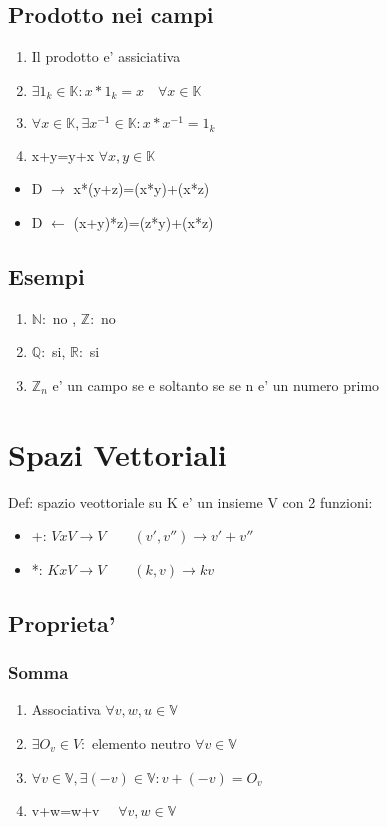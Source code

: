 \documentclass{article}
\begin{document}
\subsection{Prodotto nei campi}
\begin{enumerate}
	\item Il prodotto e' assiciativa
	\item $\exists 1_k \in \mathbb{K} : x*1_k=x \quad \forall x\in \mathbb{K}$
	\item $\forall x \in  \mathbb{K},\exists x^{-1} \in \mathbb{K}:x*x^{-1}=1_k$
	\item x+y=y+x $\forall x,y \in \mathbb{K}$
\end{enumerate}
\begin{itemize}
	\item D $\rightarrow$ x*(y+z)=(x*y)+(x*z)
	\item D $\leftarrow$ (x+y)*z)=(z*y)+(x*z)
\end{itemize}
\subsection*{Esempi}
\begin{enumerate}
	\item $\mathbb{N}:$ no , $\mathbb{Z}: $ no
	\item $\mathbb{Q}:$ si, $\mathbb{R}: $ si
	\item $\mathbb{Z}_n$ e' un campo se e soltanto se se n e' un numero primo
\end{enumerate}
\section{Spazi Vettoriali}
\begin{flushleft}
	Def: spazio veottoriale su K e' un insieme V con 2 funzioni:
\end{flushleft}
\begin{itemize}
	\item +: $VxV \to V \quad \quad (v',v'') \to v' + v''$
	\item *: $KxV \to V \quad \quad (k,v)\to kv$
\end{itemize}
\subsection*{Proprieta'}
\subsubsection*{Somma}
\begin{enumerate}
	\item Associativa $\forall v,w,u \in \mathbb{V}$
	\item $\exists O_v \in V: $ elemento neutro $\forall v \in \mathbb{V}$
	\item $\forall v \in  \mathbb{V},\exists (-v) \in \mathbb{V}:v+(-v)=O_v$
	\item v+w=w+v $\quad \forall v,w \in \mathbb{V}$
\end{enumerate}
\end{document}
